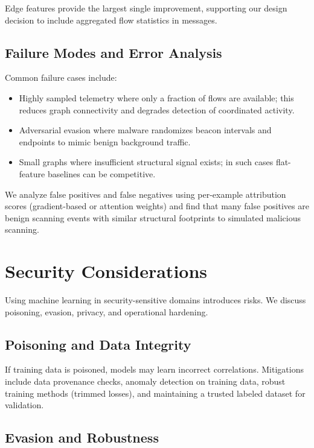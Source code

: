 \documentclass[conference]{IEEEtran}
\begin{document}
Edge features provide the largest single improvement, supporting our design decision to include aggregated flow statistics in messages.

\subsection{Failure Modes and Error Analysis}

Common failure cases include:

\begin{itemize}
	\item Highly sampled telemetry where only a fraction of flows are available; this reduces graph connectivity and degrades detection of coordinated activity.
	\item Adversarial evasion where malware randomizes beacon intervals and endpoints to mimic benign background traffic.
	\item Small graphs where insufficient structural signal exists; in such cases flat-feature baselines can be competitive.
\end{itemize}

We analyze false positives and false negatives using per-example attribution scores (gradient-based or attention weights) and find that many false positives are benign scanning events with similar structural footprints to simulated malicious scanning.

\section{Security Considerations}

Using machine learning in security-sensitive domains introduces risks. We discuss poisoning, evasion, privacy, and operational hardening.

\subsection{Poisoning and Data Integrity}

If training data is poisoned, models may learn incorrect correlations. Mitigations include data provenance checks, anomaly detection on training data, robust training methods (trimmed losses), and maintaining a trusted labeled dataset for validation.

\subsection{Evasion and Robustness}
\end{document}
